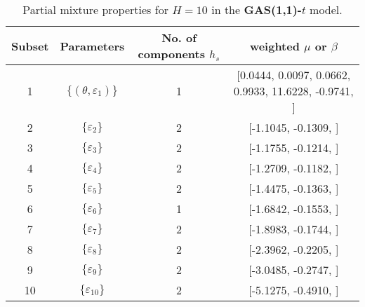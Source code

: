 \begin{table}[h] 
\centering 
\caption{Partial mixture properties for $H=10$ in the \textbf{GAS(1,1)-$t$} model.} 
\label{tab:pmits_t_gas} 
\begin{tabular}{cccc}  
 Subset & Parameters& No. of components $h_{s}$ & weighted $\mu$ or $\beta$  \\ \hline 
1 & $\{(\theta,\varepsilon_{1})\}$ & 1 & [0.0444, 0.0097, 0.0662, 0.9933, 11.6228, -0.9741, ]   \\ [1ex] 
2 & $\{\varepsilon_{2}\}$ & 2 & [-1.1045, -0.1309, ]   \\ [1ex] 
3 & $\{\varepsilon_{3}\}$ & 2 & [-1.1755, -0.1214, ]   \\ [1ex] 
4 & $\{\varepsilon_{4}\}$ & 2 & [-1.2709, -0.1182, ]   \\ [1ex] 
5 & $\{\varepsilon_{5}\}$ & 2 & [-1.4475, -0.1363, ]   \\ [1ex] 
6 & $\{\varepsilon_{6}\}$ & 1 & [-1.6842, -0.1553, ]   \\ [1ex] 
7 & $\{\varepsilon_{7}\}$ & 2 & [-1.8983, -0.1744, ]   \\ [1ex] 
8 & $\{\varepsilon_{8}\}$ & 2 & [-2.3962, -0.2205, ]   \\ [1ex] 
9 & $\{\varepsilon_{9}\}$ & 2 & [-3.0485, -0.2747, ]   \\ [1ex] 
10 & $\{\varepsilon_{10}\}$ & 2 & [-5.1275, -0.4910, ]   \\ [1ex] 
\hline 
\end{tabular} 
\end{table} 
